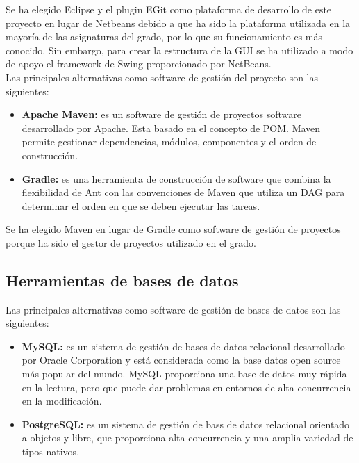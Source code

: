 \documentclass[12pt, a4paper]{book}
\begin{document}
Se ha elegido Eclipse y el plugin EGit como plataforma de desarrollo de este proyecto en lugar de Netbeans debido a que ha sido la plataforma utilizada en la mayoría de las asignaturas del grado, por lo que su funcionamiento es más conocido. Sin embargo, para crear la estructura de la \gls{GUI} se ha utilizado a modo de apoyo el framework de Swing proporcionado por NetBeans.\\

Las principales alternativas como software de gestión del proyecto son las siguientes:

\begin{itemize}
	
	\item \textbf{Apache Maven:} es un software de gestión de proyectos software desarrollado por Apache. Esta basado en el concepto de \gls{POM}. Maven permite gestionar dependencias, módulos, componentes y el orden de construcción.
	
	\item \textbf{Gradle:} es una herramienta de construcción de software que combina la flexibilidad de Ant con las convenciones de Maven que utiliza un \gls{DAG} para determinar el orden en que se deben ejecutar las tareas.
	
\end{itemize}

Se ha elegido Maven en lugar de Gradle como software de gestión de proyectos porque ha sido el gestor de proyectos utilizado en el grado.


\subsection{Herramientas de bases de datos}

Las principales alternativas como software de gestión de bases de datos son las siguientes:

\begin{itemize}
	\item \textbf{MySQL:\label{mysql}} es un sistema de gestión de bases de datos relacional desarrollado por Oracle Corporation y está considerada como la base datos open source más popular del mundo. MySQL proporciona una base de datos muy rápida en la lectura, pero que puede dar problemas en entornos de alta concurrencia en la modificación.
	
	\newpage
	
	\item \textbf{PostgreSQL:} es un sistema de gestión de bass de datos relacional orientado a objetos y libre, que proporciona alta concurrencia y una amplia variedad de tipos nativos.
	
\end{itemize}	
\end{document}
